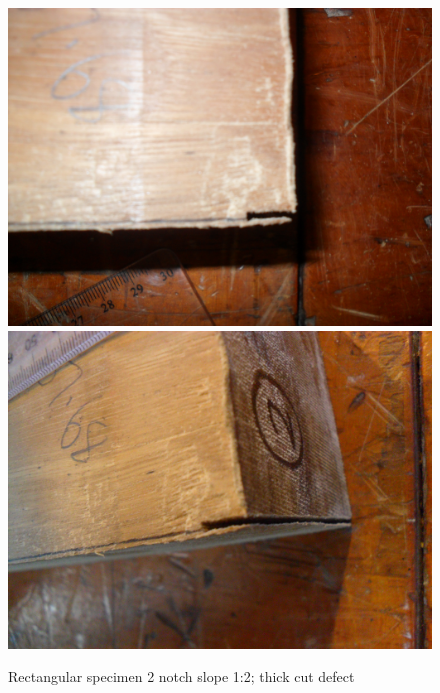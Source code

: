\documentclass[11pt,a4paper]{article}
\numberwithin{equation}{subsection}
\begin{document}
\begin{figure}[h]
	\begin{center}
		\includegraphics[scale=0.065]{Cut_Top}
		\includegraphics[scale=0.065]{Cut_Side}
	\end{center}
	\caption{Rectangular specimen 2 notch slope 1:2; thick cut defect}
	\label{fig:Rect_Cut}
\end{figure}
\end{document}
